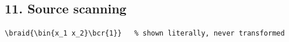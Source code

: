 \documentclass[11pt]{article}
\begin{document}
\subsection*{11. Source scanning}
\begin{verbatim}
\braid{\bin{x_1 x_2}\bcr{1}}   % shown literally, never transformed
\end{verbatim}
\end{document}
